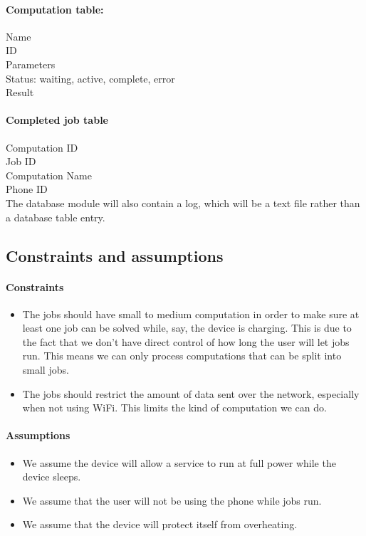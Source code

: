 \documentclass[a4paper,10pt]{article}
\begin{document}
\paragraph{Computation table:}

Name\\
ID\\
Parameters\\
Status: waiting, active, complete, error\\
Result

\paragraph{Completed job table}

Computation ID\\
Job ID\\
Computation Name\\
Phone ID\\

\noindent The database module will also contain a log, which will be a text file rather than a database table entry.

\subsection{Constraints and assumptions}%
\paragraph{Constraints}
\begin{itemize}
	\item The jobs should have small to medium computation in order to make sure at least one job can be solved while, say, the device is charging. This is due to the fact that we don't have direct control of how long the user will let jobs run. This means we can only process computations that can be split into small jobs.

	\item The jobs should restrict the amount of data sent over the network, especially when not using WiFi. This limits the kind of computation we can do.
\end{itemize} 

\paragraph{Assumptions}
\begin{itemize}
	\item We assume the device will allow a service to run at full power while the device sleeps.
	\item We assume that the user will not be using the phone while jobs run.
	\item We assume that the device will protect itself from overheating.
\end{itemize} 
\end{document}
